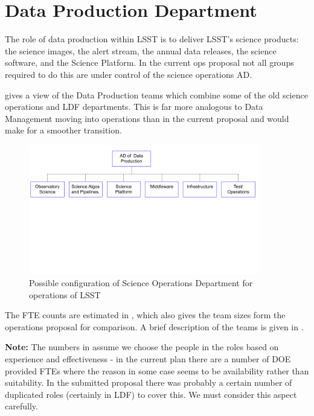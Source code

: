 \newpage
\section{Data Production Department }\label{sec:sciops} \label{sec:dataprod}

The role of data production within \gls{LSST} is to deliver \gls{LSST}'s science products: the science images, the alert stream, the annual data releases, the science \gls{software}, and the Science Platform. In the current ops proposal not all groups required to do this are under control of the  science operations \gls{AD}.

 gives a view of the Data Production teams which combine some of the old science operations  and \gls{LDF} departments. This is far more analogous to Data Management moving into operations than in the current proposal and would make for a smoother transition.

\begin{figure}
\begin{center}
\includegraphics[width=0.9\textwidth,trim=0cm 10cm 0 0, clip]{figures/SciOpsOrg}
\caption{Possible configuration of Science Operations Department for operations of \gls{LSST} \label{fig:sciopsorg}}
\end{center}
\end{figure}

The \gls{FTE} counts are estimated in , which also gives the team sizes form the operations proposal for comparison.
A brief description of the teams is given in .


{\bf Note:} The numbers in  assume we choose the people in the roles based on experience and effectiveness - in the current plan there are a number of \gls{DOE} provided FTEs where the reason in some case seems to be availability rather than suitability. In the submitted proposal there was probably a certain number of duplicated roles (certainly in \gls{LDF}) to cover this. We must consider this aspect carefully.






